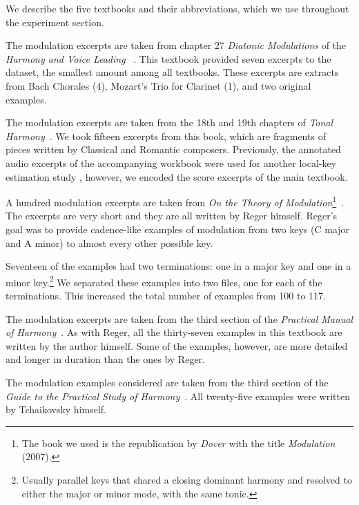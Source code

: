 We describe the five textbooks and their abbreviations,
which we use throughout the experiment section.


	The modulation excerpts are taken from chapter 27
	\emph{Diatonic Modulations} of the \emph{Harmony and
	Voice Leading} ~\cite{aldwell2018harmony}. This textbook
	provided seven excerpts to the dataset, the smallest
	amount among all textbooks. These excerpts are extracts
	from Bach Chorales (4), Mozart's Trio for Clarinet (1),
	and two original examples.

	The modulation excerpts are taken from the 18th and 19th
	chapters of \emph{Tonal Harmony}~\cite{kostka2008tonal}.
	We took fifteen excerpts from this book, which are
	fragments of pieces written by Classical and Romantic
	composers. Previously, the annotated audio excerpts of
	the accompanying workbook were used for another
	local-key estimation study \cite{izmirli2007localized},
	however, we encoded the score excerpts of the main
	textbook.

	A hundred modulation excerpts are taken from \emph{On
	the Theory of Modulation}\footnote{The book we used is
	the republication by \emph{Dover} with the title
	\emph{Modulation} (2007).}~\cite{regermodulation}. The
	excerpts are very short and they are all written by
	Reger himself. Reger's goal was to provide cadence-like
	examples of modulation from two keys (C major and A
	minor) to almost every other possible key.

	Seventeen of the examples had two terminations: one in a
	major key and one in a minor key.\footnote{Usually
	parallel keys that shared a closing dominant harmony and
	resolved to either the major or minor mode, with the
	same tonic.} We separated these examples into two files,
	one for each of the terminations. This increased the
	total number of examples from 100 to 117.

	The modulation excerpts are taken from the third section
	of the \emph{Practical Manual of
	Harmony}~\cite{rimskitonality}. As with Reger, all the
	thirty-seven examples in this textbook are written by
	the author himself. Some of the examples, however, are
	more detailed and longer in duration than the ones by
	Reger.

	The modulation examples considered are taken from the
	third section of the \emph{Guide to the Practical Study
	of Harmony}~\cite{tchaikovsky1872guide}. All twenty-five
	examples were written by Tchaikovsky himself.

